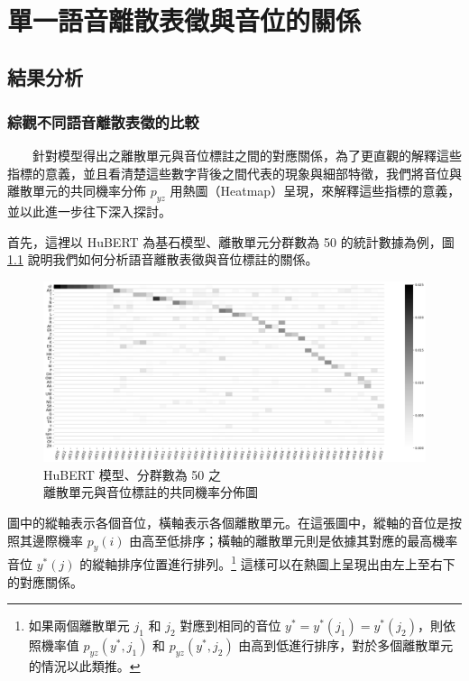 \chapter{單一語音離散表徵與音位的關係}


\section{結果分析}

\subsection{綜觀不同語音離散表徵的比較}  %

{   %
　　針對模型得出之離散單元與音位標註之間的對應關係，為了更直觀的解釋這些指標的意義，並且看清楚這些數字背後之間代表的現象與細部特徵，我們將音位與離散單元的共同機率分佈 \(p_{yz}\) 用熱圖（Heatmap）呈現，來解釋這些指標的意義，並以此進一步往下深入探討。

        首先，這裡以 HuBERT 為基石模型、離散單元分群數為 50 的統計數據為例，圖 \ref{fig:hubert-50-joint-byprob} 說明我們如何分析語音離散表徵與音位標註的關係。
{


\begin{figure}
    \centering
    \includegraphics[width=1\linewidth]{figures/hubert-50-joint-byprob.png}
    \caption{HuBERT 模型、分群數為 50 之 \\
    離散單元與音位標註的共同機率分佈圖}
    \label{fig:hubert-50-joint-byprob}
\end{figure}

}
        圖中的縱軸表示各個音位，橫軸表示各個離散單元。在這張圖中，縱軸的音位是按照其邊際機率 \(p_y(i)\) 由高至低排序；橫軸的離散單元則是依據其對應的最高機率音位 \(y^\ast(j)\) 的縱軸排序位置進行排列。\footnote{如果兩個離散單元 \(j_1\) 和 \(j_2\) 對應到相同的音位 \(y^\ast = y^\ast(j_1) = y^\ast(j_2)\)，則依照機率值 \(p_{yz}(y^\ast, j_1)\) 和 \(p_{yz}(y^\ast, j_2)\) 由高到低進行排序，對於多個離散單元的情況以此類推。} 這樣可以在熱圖上呈現出由左上至右下的對應關係。

}

